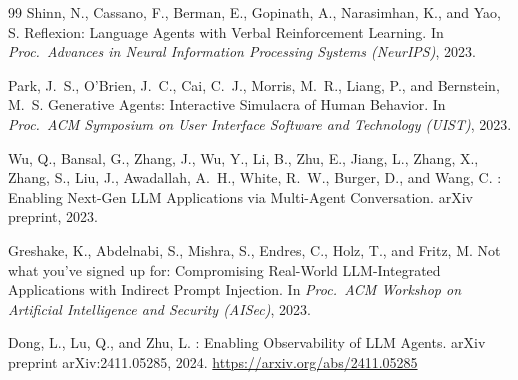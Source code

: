 \documentclass[11pt,a4paper]{article}
\theoremstyle{definition}
\theoremstyle{remark}
\begin{document}
\begin{thebibliography}{99}
Shinn, N., Cassano, F., Berman, E., Gopinath, A., Narasimhan, K.,
  and Yao, S.
\newblock Reflexion: Language Agents with Verbal Reinforcement
  Learning.
\newblock In \emph{Proc.\ Advances in Neural Information
  Processing Systems (NeurIPS)}, 2023.

Park, J.~S., O'Brien, J.~C., Cai, C.~J., Morris, M.~R., Liang,
  P., and Bernstein, M.~S.
\newblock Generative Agents: Interactive Simulacra of Human
  Behavior.
\newblock In \emph{Proc.\ ACM Symposium on User Interface
  Software and Technology (UIST)}, 2023.

Wu, Q., Bansal, G., Zhang, J., Wu, Y., Li, B., Zhu, E., Jiang, L.,
  Zhang, X., Zhang, S., Liu, J., Awadallah, A.~H., White, R.~W.,
  Burger, D., and Wang, C.
: Enabling Next-Gen {LLM} Applications via
  Multi-Agent Conversation.
\newblock arXiv preprint, 2023.

Greshake, K., Abdelnabi, S., Mishra, S., Endres, C., Holz, T.,
  and Fritz, M.
\newblock Not what you've signed up for: Compromising Real-World
  {LLM}-Integrated Applications with Indirect Prompt Injection.
\newblock In \emph{Proc.\ ACM Workshop on Artificial Intelligence
  and Security (AISec)}, 2023.

Dong, L., Lu, Q., and Zhu, L.
: Enabling Observability of {LLM} Agents.
\newblock arXiv preprint arXiv:2411.05285, 2024.
\newblock \url{https://arxiv.org/abs/2411.05285}

\end{thebibliography}
\end{document}
